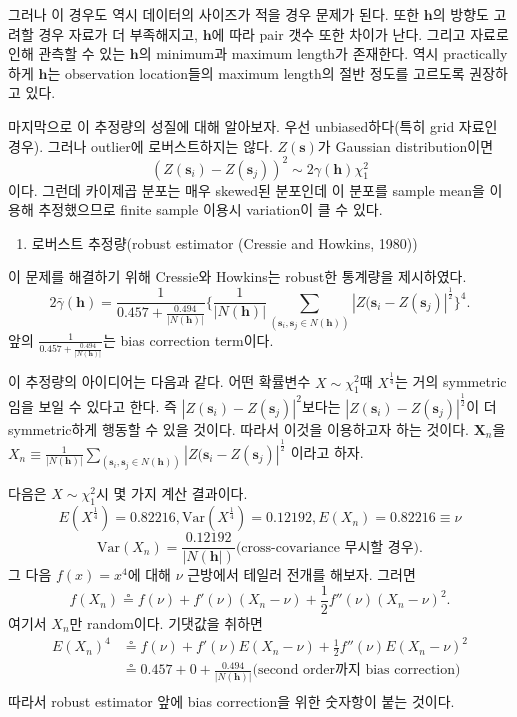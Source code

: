\documentclass[b5paper,]{scrbook}
\providecommand{\tightlist}{%
  \setlength{\itemsep}{0pt}\setlength{\parskip}{0pt}}
\theoremstyle{plain}
\theoremstyle{definition}
\numberwithin{equation}{section}
\begin{document}
그러나 이 경우도 역시 데이터의 사이즈가 적을 경우 문제가 된다. 또한
\(\mathbf{h}\)의 방향도 고려할 경우 자료가 더 부족해지고,
\(\mathbf{h}\)에 따라 pair 갯수 또한 차이가 난다. 그리고 자료로 인해
관측할 수 있는 \(\mathbf{h}\)의 minimum과 maximum length가 존재한다.
역시 practically하게 \(\mathbf{h}\)는 observation location들의 maximum
length의 절반 정도를 고르도록 권장하고 있다.

마지막으로 이 추정량의 성질에 대해 알아보자. 우선 unbiased하다(특히 grid
자료인 경우). 그러나 outlier에 로버스트하지는 않다. \(Z(\mathbf{s})\)가
Gaussian distribution이면
\[(Z(\mathbf{s}_{i})-Z(\mathbf{s}_{j}))^{2} \sim 2 \gamma(\mathbf{h})\chi_{1}^{2}\]
이다. 그런데 카이제곱 분포는 매우 skewed된 분포인데 이 분포를 sample
mean을 이용해 추정했으므로 finite sample 이용시 variation이 클 수 있다.

\begin{enumerate}
\def\labelenumi{\arabic{enumi}.}
\setcounter{enumi}{1}
\tightlist
\item
  로버스트 추정량(robust estimator (Cressie and Howkins, 1980))
\end{enumerate}

이 문제를 해결하기 위해 Cressie와 Howkins는 robust한 통계량을
제시하였다.
\[2 \bar{\gamma}(\mathbf{h})=\frac{1}{0.457+\frac{0.494}{|N(\mathbf{h})|}}\{\frac{1}{|N(\mathbf{h})|}\sum_{(\mathbf{s}_{i},\mathbf{s}_{j} \in N(\mathbf{h}))} |Z(\mathbf{s}_{i}-Z(\mathbf{s}_{j})|^{\frac{1}{2}}\}^{4}.\]
앞의 \(\frac{1}{0.457+\frac{0.494}{|N(\mathbf{h})|}}\)는 bias correction
term이다.

이 추정량의 아이디어는 다음과 같다. 어떤 확률변수
\(X \sim \chi_{1}^{2}\)때 \(X^{\frac{1}{4}}\)는 거의 symmetric임을 보일
수 있다고 한다. 즉 \(|Z(\mathbf{s}_{i})-Z(\mathbf{s}_{j})|^{2}\)보다는
\(|Z(\mathbf{s}_{i})-Z(\mathbf{s}_{j})|^{\frac{1}{2}}\)이 더
symmetric하게 행동할 수 있을 것이다. 따라서 이것을 이용하고자 하는
것이다. \(\mathbf{X}_{n}\)을
\(X_{n}\equiv\frac{1}{|N(\mathbf{h})|}\sum_{(\mathbf{s}_{i},\mathbf{s}_{j} \in N(\mathbf{h}))} |Z(\mathbf{s}_{i}-Z(\mathbf{s}_{j})|^{\frac{1}{2}}\)
이라고 하자.

다음은 \(X \sim \chi_{1}^{2}\)시 몇 가지 계산 결과이다.
\[E(X^{\frac{1}{4}})=0.82216, \text{Var}(X^{\frac{1}{4}})=0.12192, E(X_{n})=0.82216 \equiv \nu\]
\[\text{Var}(X_{n})=\frac{0.12192}{|N(\mathbf{h}|)} \text{(cross-covariance 무시할 경우)} .\]
그 다음 \(f(x)=x^{4}\)에 대해 \(\nu\) 근방에서 테일러 전개를 해보자.
그러면
\[f(X_{n})\circeq f(\nu) +f'(\nu)(X_{n}-\nu)+\frac{1}{2}f''(\nu)(X_{n}-\nu)^{2} .\]
여기서 \(X_{n}\)만 random이다. 기댓값을 취하면 \[
\begin{aligned}
E(X_{n})^{4}&\circeq f(\nu) + f'(\nu)E(X_{n}-\nu) +\frac{1}{2}f''(\nu)E(X_{n}-\nu)^{2}\\
&\circeq 0.457 + 0 +\frac{0.494}{|N(\mathbf{h})|} \text{(second order까지 bias correction)}\\
\end{aligned}
\] 따라서 robust estimator 앞에 bias correction을 위한 숫자항이 붙는
것이다.
\end{document}
